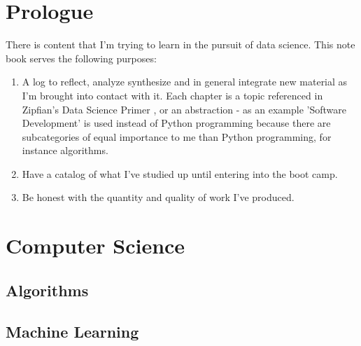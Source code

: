 \documentclass[11pt,letterpaper,oneside]{memoir}
\theoremstyle{definition}
\begin{document}
\pagestyle{empty}
\titleBC
\clearpage
\tableofcontents
\chapter*{Prologue}
There is content that I'm trying to learn in the pursuit of data science. This
note book serves the following purposes:
\begin{enumerate}
  \item A log to reflect, analyze synthesize and in general integrate new
    material as I'm brought into contact with it.  Each chapter is a topic
    referenced in Zipfian's Data Science Primer \cite{data_science_primer}, or
    an abstraction - as an example 'Software Development' is used instead of
    Python programming because there are subcategories of equal importance to
    me than Python programming, for instance algorithms.
  \item Have a catalog of what I've studied up until entering into the boot
    camp.
  \item Be honest with the quantity and quality of work I've produced.
\end{enumerate}

\chapter{Computer Science}
\section{Algorithms}
\section{Machine Learning}
\end{document}
